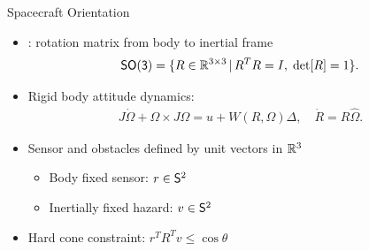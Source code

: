 \begin{frame}{Spacecraft Orientation} %

\begin{itemize}

    \item {}: rotation matrix from body to inertial frame
     \[\SO =  \{R\in\R^{3\times 3}\,|\, R^TR=I,\;\mathrm{det}[R]=1\} . \]
    \item Rigid body attitude dynamics:
    \begin{gather*}
        J\dot\Omega + \Omega\times J\Omega = u+W(R,\Omega)\Delta , \quad \dot R = R\hat\Omega .
    \end{gather*}

    \item Sensor and obstacles defined by unit vectors in \( \R^3 \) 
        \begin{itemize}
            \item Body fixed sensor: \( r \in \S^2\)
            \item Inertially fixed hazard: \( v \in \S^2 \)
        \end{itemize} 
    \item Hard cone constraint: \( r^T R^T v \leq \cos \theta \)
    
\end{itemize}
\end{frame}   %

